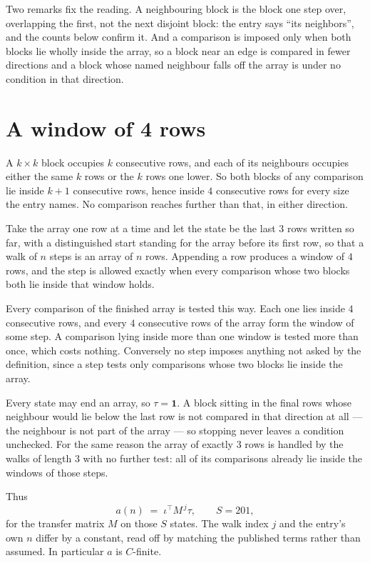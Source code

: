 \documentclass[11pt,a4paper]{article}
\theoremstyle{plain}
\theoremstyle{definition}
\begin{document}
Two remarks fix the reading. A neighbouring block is the block one step over, overlapping the
first, not the next disjoint block: the entry says ``its neighbors'', and the counts below
confirm it. And a comparison is imposed only when both blocks lie wholly inside the array, so a
block near an edge is compared in fewer directions and a block whose named neighbour falls off
the array is under no condition in that direction.

\section{A window of 4 rows}

A $k\times k$ block occupies $k$ consecutive rows, and each of its neighbours occupies either
the same $k$ rows or the $k$ rows one lower. So both blocks of any comparison lie inside $k+1$
consecutive rows, hence inside $4$ consecutive rows for every size the entry names. No
comparison reaches further than that, in either direction.

Take the array one row at a time and let the state be the last 3 rows written so far, with a
distinguished start standing for the array before its first row, so that a walk of $n$ steps is
an array of $n$ rows. Appending a row produces a window of $4$ rows, and the step is
allowed exactly when every comparison whose two blocks both lie inside that window holds.

Every comparison of the finished array is tested this way. Each one lies inside $4$
consecutive rows, and every $4$ consecutive rows of the array form the window of some
step. A comparison lying inside more than one window is tested more than once, which costs
nothing. Conversely no step imposes anything not asked by the definition, since a step tests
only comparisons whose two blocks lie inside the array.

Every state may end an array, so $\tau=\mathbf{1}$. A block sitting in the final rows whose
neighbour would lie below the last row is not compared in that direction at all --- the
neighbour is not part of the array --- so stopping never leaves a condition unchecked. For the
same reason the array of exactly $3$ rows is handled by the walks of length $3$ with no
further test: all of its comparisons already lie inside the windows of those steps.

Thus
\[
a(n)\;=\;\iota^{\!\top}M^{\,j}\tau ,\qquad S=201,
\]
for the transfer matrix $M$ on those $S$ states. The walk index $j$ and the entry's own $n$
differ by a constant, read off by matching the published terms rather than assumed. In
particular $a$ is $C$-finite.
\end{document}
